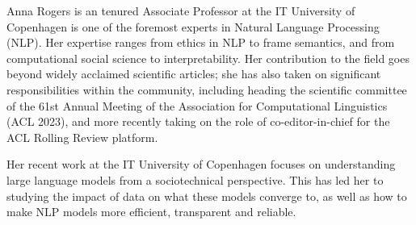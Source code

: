 Anna Rogers is an tenured Associate Professor at the IT University of Copenhagen is one of the foremost experts in Natural Language Processing (NLP). 
Her expertise ranges from ethics in NLP to frame semantics, and from computational social science to interpretability.
Her contribution to the field goes beyond widely acclaimed scientific articles; she has also taken on significant responsibilities within the community, including heading the scientific committee of the 61st Annual Meeting of the Association for Computational Linguistics (ACL 2023), and more recently taking on the role of co-editor-in-chief for the ACL Rolling Review platform.

Her recent work at the IT University of Copenhagen focuses on understanding large language models from a sociotechnical perspective. 
This has led her to studying the impact of data on what these models converge to, as well as how to make NLP models more efficient, transparent and reliable.
